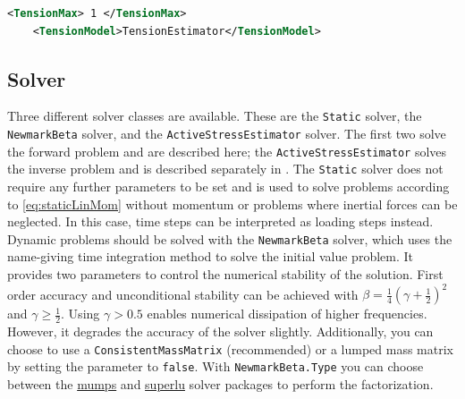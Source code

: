 \begin{lstlisting}[language=XML,caption=.xml settings for the TensionEstimator tension model]
    <TensionMax> 1 </TensionMax>
    <TensionModel>TensionEstimator</TensionModel>
\end{lstlisting}

\subsection{Solver}
\label{settings:Solver}

Three different solver classes are available.
These are the \verb|Static| solver, the \verb|NewmarkBeta| solver, and the \verb|ActiveStressEstimator| solver.
The first two solve the forward problem and are described here; the \verb|ActiveStressEstimator| solves the inverse problem and is described separately in .
The \verb|Static| solver does not require any further parameters to be set and is used to solve problems according to \autoref{eq:staticLinMom} without momentum or problems where inertial forces can be neglected.
In this case, time steps can be interpreted as loading steps instead.
Dynamic problems should be solved with the \verb|NewmarkBeta| solver, which uses the name-giving time integration method to solve the initial value problem.
It provides two parameters to control the numerical stability of the solution.
First order accuracy and unconditional stability can be achieved with $\beta = \frac{1}{4}(\gamma + \frac{1}{2})^2$ and $\gamma \geq \frac{1}{2}$.
Using $\gamma > 0.5$ enables numerical dissipation of higher frequencies.
However, it degrades the accuracy of the solver slightly.
Additionally, you can choose to use a \verb|ConsistentMassMatrix| (recommended) or a lumped mass matrix by setting the parameter to \verb|false|.
With \verb|NewmarkBeta.Type| you can choose between the \href{https://petsc.org/main/manualpages/Mat/MATSOLVERMUMPS/}{mumps} and \href{https://petsc.org/main/manualpages/Mat/MATSOLVERSUPERLU/}{superlu} solver packages to perform the factorization.


